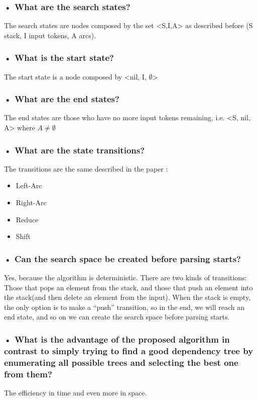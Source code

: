 \documentclass[paper=a4, fontsize=11pt]{scrartcl} %
\numberwithin{equation}{section} %
\numberwithin{figure}{section} %
\numberwithin{table}{section} %
\begin{document}
\subsubsection*{• What are the search states?}
The search states are nodes composed by the set <S,I,A> as described before (S stack, I input tokens, A arcs). 

\subsubsection*{• What is the start state?}
The start state is a node composed by <nil, I, $\emptyset$>

\subsubsection*{• What are the end states?}
The end states are those who have no more input tokens remaining, i.e. <S, nil, A> where $A\neq\emptyset$

\subsubsection*{• What are the state transitions?}
The transitions are the same described in the paper :
\begin{itemize}
	\item Left-Arc
	\item Right-Arc
	\item Reduce
	\item Shift
\end{itemize}

\subsubsection*{• Can the search space be created before parsing starts?}
Yes, because the algorithm is deterministic. There are two kinds of transitions: Those that pops an element from the stack, and those that push an element into the stack(and then delete an element from the input). When the stack is empty, the only option is to make a “push” transition, so in the end, we will reach an end state, and so on we can create the search space before parsing starts.

\subsubsection*{• What is the advantage of the proposed algorithm in contrast to simply trying to find a good dependency tree by enumerating all possible trees and selecting the best one from them?}
The efficiency in time and even more in space.
\end{document}
